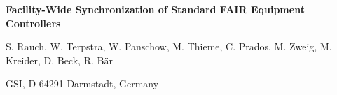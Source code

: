 \documentclass[25pt,halfparskip-,pagesize]{scrartcl}
\begin{document}
\vspace*{1ex}

{\centering
\begin{minipage}{20in}
\centering \sffamily\Huge \rule{0pt}{50pt}\textbf{Facility-Wide Synchronization of Standard FAIR Equipment Controllers}\par
\vspace{5mm} \LARGE S. Rauch,
W. Terpstra,
W. Panschow,
M. Thieme,
C. Prados,
M. Zweig,
M. Kreider,
D. Beck,
R. B\"ar
\par
\vspace{5mm}
\Large GSI, D-64291 Darmstadt, Germany
\rule[-12pt]{0pt}{10pt}\par
\end{minipage}%
\par}%

\vspace{11cm}
\setlength{\fboxrule}{1pt}
\end{document}
